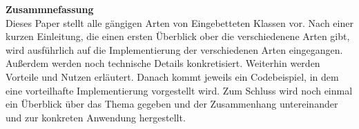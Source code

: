 \vspace*{2cm}
{\bf\Large Zusammnefassung} \\ [1em]
Dieses Paper stellt alle gängigen Arten von Eingebetteten Klassen vor.
Nach einer kurzen Einleitung, die einen ersten Überblick ober die verschiedenene Arten gibt, wird ausführlich auf die Implementierung  der verschiedenen Arten eingegangen.
Außerdem werden noch technische Details konkretisiert. Weiterhin werden Vorteile und Nutzen erläutert.
Danach kommt jeweils ein Codebeispiel, in dem eine vorteilhafte Implementierung vorgestellt wird.
Zum Schluss wird noch einmal ein Überblick über das Thema gegeben und der Zusammenhang untereinander und zur konkreten Anwendung hergestellt.
\clearpage
